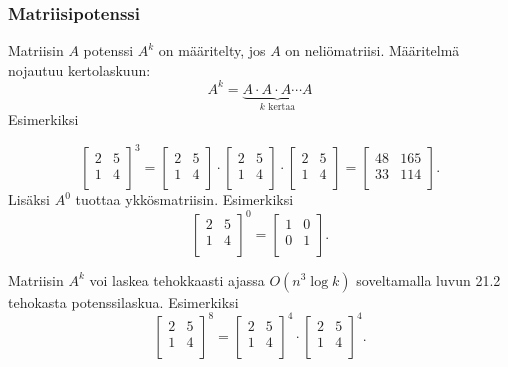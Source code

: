\subsubsection{Matriisipotenssi}


Matriisin $A$ potenssi $A^k$ on
määritelty, jos $A$ on neliömatriisi.
Määritelmä nojautuu kertolaskuun:
\[ A^k = \underbrace{A \cdot A \cdot A \cdots A}_{\textrm{$k$ kertaa}} \]
Esimerkiksi

\[
 \begin{bmatrix}
  2 & 5 \\
  1 & 4 \\
 \end{bmatrix}^3 =
 \begin{bmatrix}
  2 & 5 \\
  1 & 4 \\
 \end{bmatrix} \cdot
 \begin{bmatrix}
  2 & 5 \\
  1 & 4 \\
 \end{bmatrix} \cdot
 \begin{bmatrix}
  2 & 5 \\
  1 & 4 \\
 \end{bmatrix} =
 \begin{bmatrix}
  48 & 165 \\
  33 & 114 \\
 \end{bmatrix}.
\]
Lisäksi $A^0$ tuottaa ykkösmatriisin. Esimerkiksi
\[
 \begin{bmatrix}
  2 & 5 \\
  1 & 4 \\
 \end{bmatrix}^0 =
 \begin{bmatrix}
  1 & 0 \\
  0 & 1 \\
 \end{bmatrix}.
\]

Matriisin $A^k$ voi laskea tehokkaasti ajassa
$O(n^3 \log k)$ soveltamalla luvun 21.2
tehokasta potenssilaskua. Esimerkiksi
\[
 \begin{bmatrix}
  2 & 5 \\
  1 & 4 \\
 \end{bmatrix}^8 =
 \begin{bmatrix}
  2 & 5 \\
  1 & 4 \\
 \end{bmatrix}^4 \cdot
 \begin{bmatrix}
  2 & 5 \\
  1 & 4 \\
 \end{bmatrix}^4.
\]


